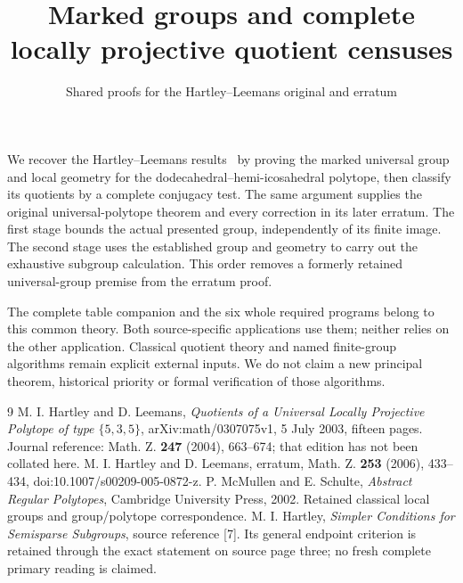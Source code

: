 \documentclass[11pt,a4paper]{article}
\title{Marked groups and complete locally projective quotient censuses}
\author{Shared proofs for the Hartley--Leemans original and erratum}\date{}
\begin{document}
\maketitle
We recover the Hartley--Leemans results~\cite{source,erratum} by proving the marked universal group and local geometry for the dodecahedral--hemi-icosahedral polytope, then classify its quotients by a complete conjugacy test. The same argument supplies the original universal-polytope theorem and every correction in its later erratum. The first stage bounds the actual presented group, independently of its finite image. The second stage uses the established group and geometry to carry out the exhaustive subgroup calculation. This order removes a formerly retained universal-group premise from the erratum proof.

The complete table companion and the six whole required programs belong to this common theory. Both source-specific applications use them; neither relies on the other application. Classical quotient theory and named finite-group algorithms remain explicit external inputs. We do not claim a new principal theorem, historical priority or formal verification of those algorithms.







\begin{thebibliography}{9}
 M. I. Hartley and D. Leemans, \emph{Quotients of a Universal Locally Projective Polytope of type $\{5,3,5\}$}, arXiv:math/0307075v1, 5 July 2003, fifteen pages. Journal reference: Math. Z. \textbf{247} (2004), 663--674; that edition has not been collated here.
 M. I. Hartley and D. Leemans, erratum, Math. Z. \textbf{253} (2006), 433--434, doi:10.1007/s00209-005-0872-z.
 P. McMullen and E. Schulte, \emph{Abstract Regular Polytopes}, Cambridge University Press, 2002. Retained classical local groups and group/polytope correspondence.
 M. I. Hartley, \emph{Simpler Conditions for Semisparse Subgroups}, source reference [7]. Its general endpoint criterion is retained through the exact statement on source page three; no fresh complete primary reading is claimed.
\end{thebibliography}
\end{document}
